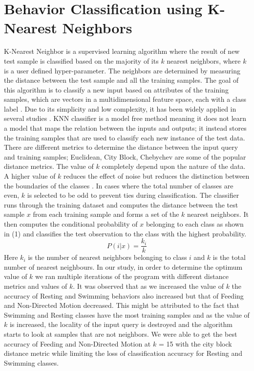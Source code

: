 \documentclass[conference]{IEEEtran}
\begin{document}
\section{Behavior Classification using K-Nearest Neighbors}
K-Nearest Neighbor is a supervised learning algorithm where the result of new test sample is classified based on the majority of its $k$ nearest neighbors, where $k$ is a user defined hyper-parameter. The neighbors are determined by measuring the distance between the test sample and all the training samples. The goal of this algorithm is to classify a new input based on attributes of the training samples, which are vectors in a multidimensional feature space, each with a class label \cite{17}. Due to its simplicity and low complexity, it has been widely applied in several studies \cite{16, 17, 18}. KNN classifier is a model free method meaning it does not learn a model that maps the relation between the inputs and outputs; it instead stores the training samples that are used to classify each new instance of the test data\cite{19}. There are different metrics to determine the distance between the input query and training samples; Euclidean, City Block, Chebychev are some of the popular distance metrics. The value of $k$ completely depend upon the nature of the data. A higher value of $k$ reduces the effect of noise but reduces the distinction between the boundaries of the classes \cite{17}. In cases where the total number of classes are even, $k$ is selected to be odd to prevent ties during classification. 
The classifier runs through the training dataset and computes the distance between the test sample $x$ from each training sample and forms a set of the $k$ nearest neighbors. It then computes the conditional probability of $x$ belonging to each class as shown in (1) and classifies the test observation to the class with the highest probability.
\begin{equation}
P(i|x) = \frac{k_i}{k}
\end{equation}
Here $k_i$ is the number of nearest neighbors belonging to class $i$ and $k$ is the total number of nearest neighbours. In our study, in order to determine the optimum value of $k$ we ran multiple iterations of the program with different distance metrics and values of $k$. It was observed that as we increased the value of $k$ the accuracy of Resting and Swimming behaviors also increased but that of Feeding and Non-Directed Motion decreased. This might be attributed to the fact that Swimming and Resting classes have the most training samples and as the value of $k$ is increased, the locality of the input query is destroyed and the algorithm starts to look at samples that are not neighbors.  We were able to get the best accuracy of Feeding and Non-Directed Motion at $k$ = 15 with the city block distance metric while limiting the loss of classification  accuracy for Resting and Swimming classes.
\end{document}
